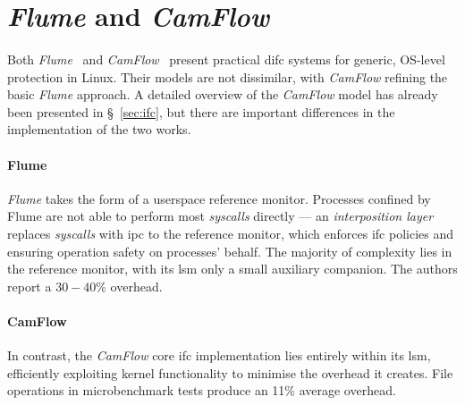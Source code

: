 

\section{\textit{Flume} and \textit{CamFlow}}

\paragraph{} Both \textit{Flume}~\cite{flume} and \textit{CamFlow}~\cite{camflow} present practical \acrshort{difc} systems for generic, OS-level protection in Linux. Their models are not dissimilar, with \textit{CamFlow} refining the basic \textit{Flume} approach. A detailed overview of the \textit{CamFlow} model has already been presented in §~\ref{sec:ifc}, but there are important differences in the implementation of the two works.

\paragraph{Flume} \textit{Flume} takes the form of a userspace reference monitor. Processes confined by Flume are not able to perform most \textit{syscalls} directly --- an \textit{interposition layer} replaces \textit{syscalls} with \acrfull{ipc} to the reference monitor, which enforces \acrshort{ifc} policies and ensuring operation safety on processes' behalf. The majority of complexity lies in the reference monitor, with its \acrshort{lsm} only a small auxiliary companion. The authors report a $30-40$\% overhead.

\paragraph{CamFlow} In contrast, the \textit{CamFlow} core \acrshort{ifc} implementation lies entirely within its \acrshort{lsm}, efficiently exploiting kernel functionality to minimise the overhead it creates. File operations in microbenchmark tests produce an 11\% average overhead.


